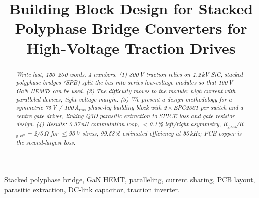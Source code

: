 \documentclass[conference]{IEEEtran}
\newcommand{\plan}[1]{\textcolor{blue!60!black}{\textit{#1}}}
\begin{document}
\title{Building Block Design for Stacked Polyphase Bridge Converters for High-Voltage Traction Drives}
\author{}
\maketitle

\begin{abstract}
\plan{Write last, 150--200 words, 4 numbers. (1) 800\,V traction relies on 1.2\,kV SiC; stacked polyphase bridges (SPB) split the bus into series low-voltage modules so that 100\,V GaN HEMTs can be used. (2) The difficulty moves to the module: high current with paralleled devices, tight voltage margin. (3) We present a design methodology for a symmetric 75\,V / 100\,A$_\mathrm{rms}$ phase-leg building block with 2\,$\times$\,EPC2361 per switch and a centre gate driver, linking Q3D parasitic extraction to SPICE loss and gate-resistor design. (4) Results: 0.37\,nH commutation loop, $<$0.1\,\% left/right asymmetry, R$_\mathrm{g,on}$/R$_\mathrm{g,off}$ = 2/0\,$\Omega$ for $\leq$90\,V stress, 99.58\,\% estimated efficiency at 50\,kHz; PCB copper is the second-largest loss.}
\end{abstract}

\begin{IEEEkeywords}
Stacked polyphase bridge, GaN HEMT, paralleling, current sharing, PCB layout, parasitic extraction, DC-link capacitor, traction inverter.
\end{IEEEkeywords}

\end{document}
